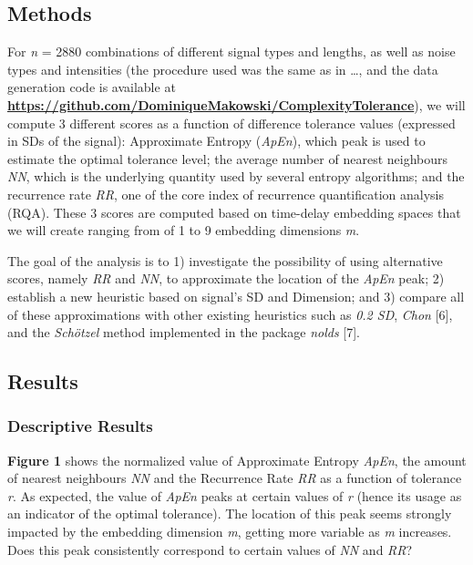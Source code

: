 \documentclass[
  man]{apa6}
\begin{document}
\hypertarget{methods}{%
\subsection{Methods}\label{methods}}

For \emph{n} = 2880 combinations of different signal types and lengths, as well as noise types and intensities (the procedure used was the same as in \ldots, and the data generation code is available at \textbf{\url{https://github.com/DominiqueMakowski/ComplexityTolerance}}), we will compute 3 different scores as a function of difference tolerance values (expressed in SDs of the signal): Approximate Entropy (\emph{ApEn}), which peak is used to estimate the optimal tolerance level; the average number of nearest neighbours \emph{NN}, which is the underlying quantity used by several entropy algorithms; and the recurrence rate \emph{RR}, one of the core index of recurrence quantification analysis (RQA). These 3 scores are computed based on time-delay embedding spaces that we will create ranging from of 1 to 9 embedding dimensions \emph{m}.

The goal of the analysis is to 1) investigate the possibility of using alternative scores, namely \emph{RR} and \emph{NN}, to approximate the location of the \emph{ApEn} peak; 2) establish a new heuristic based on signal's SD and Dimension; and 3) compare all of these approximations with other existing heuristics such as \emph{0.2 SD}, \emph{Chon} {[}6{]}, and the \emph{Schötzel} method implemented in the package \emph{nolds} {[}7{]}.

\hypertarget{results}{%
\subsection{Results}\label{results}}

\hypertarget{descriptive-results}{%
\subsubsection{Descriptive Results}\label{descriptive-results}}

\textbf{Figure 1} shows the normalized value of Approximate Entropy \emph{ApEn}, the amount of nearest neighbours \emph{NN} and the Recurrence Rate \emph{RR} as a function of tolerance \emph{r}. As expected, the value of \emph{ApEn} peaks at certain values of \emph{r} (hence its usage as an indicator of the optimal tolerance). The location of this peak seems strongly impacted by the embedding dimension \emph{m}, getting more variable as \emph{m} increases. Does this peak consistently correspond to certain values of \emph{NN} and \emph{RR}?
\end{document}
